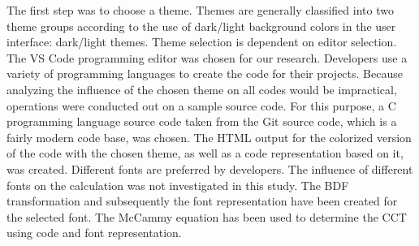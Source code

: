 \documentclass{article}
\begin{document}
The first step was to choose a theme. Themes are generally classified into two theme groups according to the use of dark/light background colors in the user interface: dark/light themes.  Theme selection is dependent on editor selection. The VS Code programming editor was chosen for our research. Developers use a variety of programming languages to create the code for their projects. Because analyzing the influence of the chosen theme on all codes would be impractical, operations were conducted out on a sample source code. For this purpose, a C programming language source code taken from the Git source code, which is a fairly modern code base, was chosen. The HTML output for the colorized version of the code with the chosen theme, as well as a code representation based on it, was created. Different fonts are preferred by developers. The influence of different fonts on the calculation was not investigated in this study. The BDF transformation and subsequently the font representation have been created for the selected font. The McCammy equation has been used to determine the CCT using code and font representation.

\begin{comment}
The flow of transactions taking place in the analysis is presented below, each of which is detailed in the relevant sections. As can be seen in this flowchart, all the coloring themes chosen for a single source code and font sample (bk. \ref{sec:material-methods.inputs})  are kept constant as analysis input is handled separately.
\end{comment}
\end{document}
